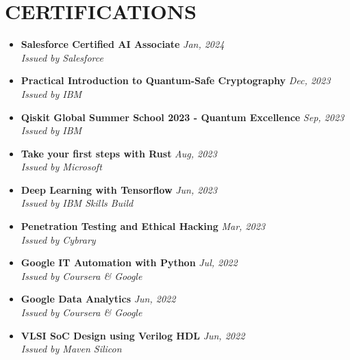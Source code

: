 \documentclass[12pt]{my_cv}
\begin{document}
\section{CERTIFICATIONS}
\begin{itemize}
\item \textbf{
Salesforce Certified AI Associate} \hfill \textit{Jan, 2024}
\\ \textit{Issued by Salesforce}
\item \textbf{Practical Introduction to Quantum-Safe Cryptography} \hfill \textit{Dec, 2023}
\\ \textit{Issued by IBM}
\item \textbf{Qiskit Global Summer School 2023 - Quantum Excellence} \hfill \textit{Sep, 2023}
\\ \textit{Issued by IBM}
\item \textbf{Take your first steps with Rust} \hfill \textit{Aug, 2023}
\\ \textit{Issued by Microsoft}
\item \textbf{Deep Learning with Tensorflow} \hfill \textit{Jun, 2023}
\\ \textit{Issued by IBM Skills Build}
\item \textbf{Penetration Testing and Ethical Hacking} \hfill \textit{Mar, 2023}
\\ \textit{Issued by Cybrary}
\item \textbf{Google IT Automation with Python} \hfill \textit{Jul, 2022}
\\ \textit{Issued by Coursera \& Google}
\item \textbf{Google Data Analytics} \hfill \textit{Jun, 2022}
\\ \textit{Issued by Coursera \& Google}
\item \textbf{VLSI SoC Design using Verilog HDL} \hfill \textit{Jun, 2022}
\\ \textit{Issued by Maven Silicon }
\end{itemize}
\end{document}

